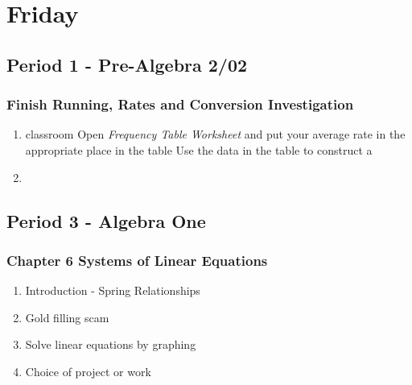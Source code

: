    	 \section[Fri]{Friday}
         \subsection[PA2/02]{Period 1 - Pre-Algebra 2/02}
         \begin{frame}[label=PA2_02]
           	\frametitle{Finish Running, Rates and Conversion Investigation}

          \begin{enumerate}
   	   	   \item {} classroom 
   	   	   \rightarrowitem Open \emph{Frequency Table Worksheet} and put your average rate in the appropriate place in the table
   	   	   \rightarrowitem Use the data in the table to construct a 
   	   	   \item \mangahighlogo
   	     \end{enumerate}

         \end{frame}
     \subsection[ALG]{Period 3 - Algebra One}
     \begin{frame}[label=ALG1]
     	\frametitle{Chapter 6 Systems of Linear Equations}

           \begin{enumerate}
   	   	   \item Introduction - Spring Relationships 
   	   	   \item {} Gold filling scam 
   	   	   \item {} {Solve linear equations by graphing} 
   	   	   \item Choice of project or \Texbook work
   	     \end{enumerate}

      \end{frame}
